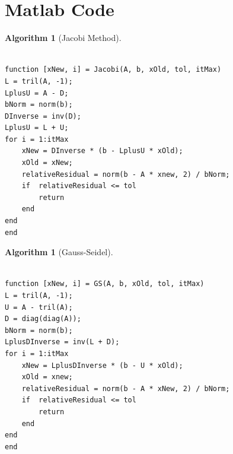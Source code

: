 \documentclass[12pt,letterpaper]{article}
\theoremstyle{definition}
\newtheorem{algorithm}[thm]{Algorithm}
\begin{document}
\appendix
\section{Matlab Code}
\begin{algorithm}[Jacobi Method]
\begin{lstlisting}

function [xNew, i] = Jacobi(A, b, xOld, tol, itMax)
L = tril(A, -1);
LplusU = A - D;
bNorm = norm(b);
DInverse = inv(D);
LplusU = L + U;
for i = 1:itMax
    xNew = DInverse * (b - LplusU * xOld);
    xOld = xNew;
    relativeResidual = norm(b - A * xnew, 2) / bNorm;
    if  relativeResidual <= tol
        return
    end
end
end
\end{lstlisting}
\end{algorithm}

\begin{algorithm}[Gauss-Seidel]
\begin{lstlisting}

function [xNew, i] = GS(A, b, xOld, tol, itMax)
L = tril(A, -1);
U = A - tril(A);
D = diag(diag(A));
bNorm = norm(b);
LplusDInverse = inv(L + D);
for i = 1:itMax
    xNew = LplusDInverse * (b - U * xOld);
    xOld = xnew;
    relativeResidual = norm(b - A * xNew, 2) / bNorm;
    if  relativeResidual <= tol
        return
    end
end
end
\end{lstlisting}
\end{algorithm}
\end{document}
